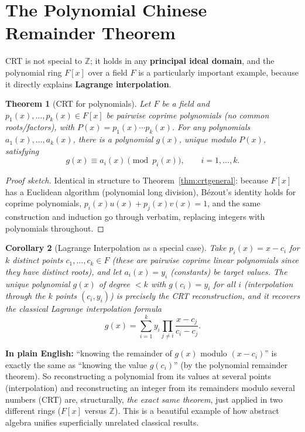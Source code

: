 \documentclass[11pt]{article}
\newtheorem{theorem}{Theorem}[section]
\newtheorem{corollary}[theorem]{Corollary}
\theoremstyle{definition}
\theoremstyle{remark}
\newcommand{\Z}{\mathbb{Z}}
\begin{document}
\section{The Polynomial Chinese Remainder Theorem}\label{sec:polynomial}

CRT is not special to $\Z$; it holds in any \textbf{principal ideal domain}, and the polynomial ring $F[x]$ over a field $F$ is a particularly important example, because it directly explains \textbf{Lagrange interpolation}.

\begin{theorem}[CRT for polynomials]\label{thm:polycrt}
Let $F$ be a field and $p_1(x),\dots,p_k(x) \in F[x]$ be pairwise coprime polynomials (no common roots/factors), with $P(x) = p_1(x)\cdots p_k(x)$. For any polynomials $a_1(x),\dots,a_k(x)$, there is a polynomial $g(x)$, unique modulo $P(x)$, satisfying
\[
g(x) \equiv a_i(x) \pmod{p_i(x)}, \qquad i=1,\dots,k.
\]
\end{theorem}
\begin{proof}[Proof sketch]
Identical in structure to Theorem~\ref{thm:crtgeneral}: because $F[x]$ has a Euclidean algorithm (polynomial long division), Bézout's identity holds for coprime polynomials, $p_i(x)u(x)+p_j(x)v(x)=1$, and the same construction and induction go through verbatim, replacing integers with polynomials throughout.
\end{proof}

\begin{corollary}[Lagrange Interpolation as a special case]
Take $p_i(x) = x - c_i$ for $k$ distinct points $c_1,\dots,c_k \in F$ (these are pairwise coprime linear polynomials since they have distinct roots), and let $a_i(x) = y_i$ (constants) be target values. The unique polynomial $g(x)$ of degree $<k$ with $g(c_i)=y_i$ for all $i$ (interpolation through the $k$ points $(c_i,y_i)$) is precisely the CRT reconstruction, and it recovers the classical Lagrange interpolation formula
\[
g(x) = \sum_{i=1}^k y_i \prod_{j\ne i} \frac{x-c_j}{c_i - c_j}.
\]
\end{corollary}

\noindent\textbf{In plain English:} ``knowing the remainder of $g(x)$ modulo $(x-c_i)$'' is exactly the same as ``knowing the value $g(c_i)$'' (by the polynomial remainder theorem). So reconstructing a polynomial from its values at several points (interpolation) and reconstructing an integer from its remainders modulo several numbers (CRT) are, structurally, \emph{the exact same theorem}, just applied in two different rings ($F[x]$ versus $\Z$). This is a beautiful example of how abstract algebra unifies superficially unrelated classical results.
\end{document}
